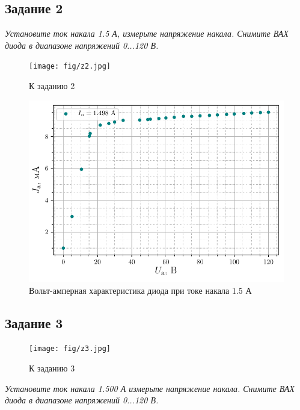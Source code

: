 \subsection{Задание 2}
\textit{Установите ток накала 1.5 А, измерьте напряжение накала. Снимите ВАХ
диода в диапазоне напряжений 0...120 В.}

\begin{figure}[H]
	\centering
	\texttt{[image: fig/z2.jpg]}
	\caption{К заданию 2}
	\label{fig:14}
\end{figure}


\begin{figure}[H]
	\centering
    \includegraphics[scale=1]{scripts/fig2}
	\caption{Вольт-амперная характеристика диода при токе накала 1.5 А}
	\label{fig:15}
\end{figure}

\subsection{Задание 3}

\begin{figure}[h!]
	\centering
	\texttt{[image: fig/z3.jpg]}
	\caption{К заданию 3}
	\label{fig:16}
\end{figure}

\textit{Установите ток накала 1.500 А измерьте напряжение накала. Снимите ВАХ
диода в диапазоне напряжений 0...120 В.}

